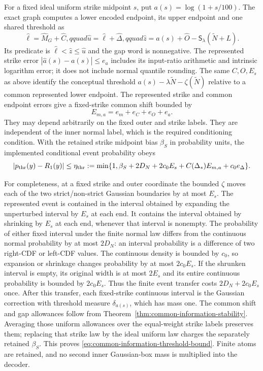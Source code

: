 For a fixed ideal uniform strike midpoint $s$, put $a(s)=\log(1+s/100)$.
The exact graph computes a lower encoded endpoint, its upper endpoint
and one shared threshold as
\begin{equation}
 \widehat\ell=\widehat M_G+\widehat C,qquad
 \widehat u=\widehat\ell+\widehat\Delta,qquad
 \widehat z=\widehat a(s)+\widehat O
                       -\mathsf S_\lambda(\widetilde N+L).
 \label{eq:common-information-threshold-endpoints}
\end{equation}
Its predicate is $\widehat\ell<\widehat z\leq\widehat u$ and the gap
word is nonnegative. The represented strike error
$|\widehat a(s)-a(s)|\leq e_a$ includes its input-ratio arithmetic
and intrinsic logarithm error; it does not include normal quantile
rounding. The same $C,O,E_s$ as above identify the conceptual threshold
$a(s)-\lambda\widetilde N-\zeta(\widetilde N)$ relative to a common
represented lower endpoint. The represented strike and common endpoint
errors give a fixed-strike common shift bounded by
\begin{equation}
 E_{m,a}=e_m+e_C+e_O+e_a.
 \label{eq:common-information-threshold-common-error}
\end{equation}
They may depend arbitrarily on the fixed outer and strike labels.
They are independent of the inner normal label, which is the required
conditioning condition. With the retained strike midpoint bias $\beta_S$
in probability units, the implemented conditional event probability
obeys
\begin{equation}
 |p_{\rm thr}(y)-R_1(y)|\leq\eta_{\rm thr}:=
 \min\{1,\beta_S+2D_N+2c_0E_s
                     +C(\Delta_*)E_{m,a}+c_0e_\Delta\}.
 \label{eq:common-information-threshold-bound}
\end{equation}

For completeness, at a fixed strike and outer coordinate the bounded
$\zeta$ moves each of the two strict/non-strict Gaussian boundaries by
at most $E_s$. The represented event is contained in the interval
obtained by expanding the unperturbed interval by $E_s$ at each end.
It contains the interval obtained by shrinking by $E_s$ at each end,
whenever that interval is nonempty. The probability of either fixed
interval under the finite normal law differs from the continuous normal
probability by at most $2D_N$: an interval probability is a difference
of two right-CDF or left-CDF values. The continuous density is bounded
by $c_0$, so expansion or shrinkage changes probability by at most
$2c_0E_s$. If the shrunken interval is empty, its original width is
at most $2E_s$ and its entire continuous probability is bounded by
$2c_0E_s$. Thus the finite event transfer costs $2D_N+2c_0E_s$ once.
After this transfer, each fixed-strike continuous interval is the
Gaussian correction with threshold measure $\delta_{a(s)}$, which has
mass one. The common shift and gap allowances follow from
Theorem~\ref{thm:common-information-stability}. Averaging those uniform
allowances over the equal-weight strike labels preserves them; replacing
that strike law by the ideal uniform law charges the separately retained
$\beta_S$. This proves \eqref{eq:common-information-threshold-bound}.
Finite atoms are retained, and no second inner Gaussian-box mass is
multiplied into the decoder.

